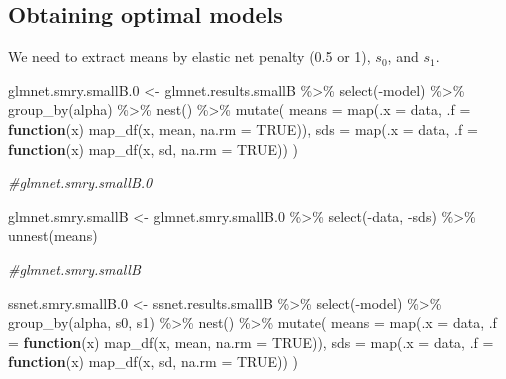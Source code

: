 \documentclass[
]{article}
\newenvironment{Shaded}{\begin{snugshade}}{\end{snugshade}}
\newcommand{\AttributeTok}[1]{\textcolor[rgb]{0.77,0.63,0.00}{#1}}
\newcommand{\CommentTok}[1]{\textcolor[rgb]{0.56,0.35,0.01}{\textit{#1}}}
\newcommand{\ConstantTok}[1]{\textcolor[rgb]{0.00,0.00,0.00}{#1}}
\newcommand{\ControlFlowTok}[1]{\textcolor[rgb]{0.13,0.29,0.53}{\textbf{#1}}}
\newcommand{\FloatTok}[1]{\textcolor[rgb]{0.00,0.00,0.81}{#1}}
\newcommand{\FunctionTok}[1]{\textcolor[rgb]{0.00,0.00,0.00}{#1}}
\newcommand{\NormalTok}[1]{#1}
\newcommand{\OtherTok}[1]{\textcolor[rgb]{0.56,0.35,0.01}{#1}}
\newcommand{\SpecialCharTok}[1]{\textcolor[rgb]{0.00,0.00,0.00}{#1}}
\begin{document}
\hypertarget{obtaining-optimal-models-1}{%
\subsection{Obtaining optimal models}\label{obtaining-optimal-models-1}}

We need to extract means by elastic net penalty (0.5 or 1), \(s_0\), and
\(s_1\).

\begin{Shaded}
\begin{Highlighting}[]
\NormalTok{glmnet.smry.smallB}\FloatTok{.0} \OtherTok{\textless{}{-}}\NormalTok{ glmnet.results.smallB }\SpecialCharTok{\%\textgreater{}\%} 
  \FunctionTok{select}\NormalTok{(}\SpecialCharTok{{-}}\NormalTok{model) }\SpecialCharTok{\%\textgreater{}\%}
  \FunctionTok{group\_by}\NormalTok{(alpha) }\SpecialCharTok{\%\textgreater{}\%}
  \FunctionTok{nest}\NormalTok{() }\SpecialCharTok{\%\textgreater{}\%}
  \FunctionTok{mutate}\NormalTok{(}
    \AttributeTok{means =} \FunctionTok{map}\NormalTok{(}\AttributeTok{.x =}\NormalTok{ data, }\AttributeTok{.f =} \ControlFlowTok{function}\NormalTok{(x) }\FunctionTok{map\_df}\NormalTok{(x, mean, }\AttributeTok{na.rm =} \ConstantTok{TRUE}\NormalTok{)),}
    \AttributeTok{sds =} \FunctionTok{map}\NormalTok{(}\AttributeTok{.x =}\NormalTok{ data, }\AttributeTok{.f =} \ControlFlowTok{function}\NormalTok{(x) }\FunctionTok{map\_df}\NormalTok{(x, sd, }\AttributeTok{na.rm =} \ConstantTok{TRUE}\NormalTok{))}
\NormalTok{    )}

\CommentTok{\#glmnet.smry.smallB.0}

\NormalTok{glmnet.smry.smallB }\OtherTok{\textless{}{-}}\NormalTok{ glmnet.smry.smallB}\FloatTok{.0} \SpecialCharTok{\%\textgreater{}\%} 
  \FunctionTok{select}\NormalTok{(}\SpecialCharTok{{-}}\NormalTok{data, }\SpecialCharTok{{-}}\NormalTok{sds) }\SpecialCharTok{\%\textgreater{}\%}
  \FunctionTok{unnest}\NormalTok{(means)}

\CommentTok{\#glmnet.smry.smallB}

\NormalTok{ssnet.smry.smallB}\FloatTok{.0} \OtherTok{\textless{}{-}}\NormalTok{ ssnet.results.smallB }\SpecialCharTok{\%\textgreater{}\%}
  \FunctionTok{select}\NormalTok{(}\SpecialCharTok{{-}}\NormalTok{model) }\SpecialCharTok{\%\textgreater{}\%}
  \FunctionTok{group\_by}\NormalTok{(alpha, s0, s1) }\SpecialCharTok{\%\textgreater{}\%}
  \FunctionTok{nest}\NormalTok{() }\SpecialCharTok{\%\textgreater{}\%}
  \FunctionTok{mutate}\NormalTok{(}
    \AttributeTok{means =} \FunctionTok{map}\NormalTok{(}\AttributeTok{.x =}\NormalTok{ data, }\AttributeTok{.f =} \ControlFlowTok{function}\NormalTok{(x) }\FunctionTok{map\_df}\NormalTok{(x, mean, }\AttributeTok{na.rm =} \ConstantTok{TRUE}\NormalTok{)),}
    \AttributeTok{sds =} \FunctionTok{map}\NormalTok{(}\AttributeTok{.x =}\NormalTok{ data, }\AttributeTok{.f =} \ControlFlowTok{function}\NormalTok{(x) }\FunctionTok{map\_df}\NormalTok{(x, sd, }\AttributeTok{na.rm =} \ConstantTok{TRUE}\NormalTok{))}
\NormalTok{    )}


\end{Highlighting}
\end{Shaded}
\end{document}
